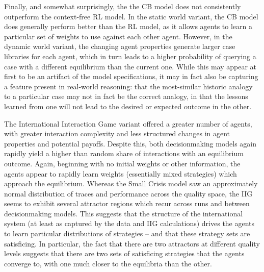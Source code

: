 Finally, and somewhat surprisingly, the the CB model does not consistently outperform the context-free RL model. In the static world variant, the CB model does generally perform better than the RL model, as it allows agents to learn a particular set of weights to use against each other agent. However, in the dynamic world variant, the changing agent properties generate larger case libraries for each agent, which in turn leads to a higher probability of querying a case with a different equilibrium than the current one. While this may appear at first to be an artifact of the model specifications, it may in fact also be capturing a feature present in real-world reasoning: that the most-similar historic analogy to a particular case may not in fact be the correct analogy, in that the lessons learned from one will not lead to the desired or expected outcome in the other.

The International Interaction Game variant offered a greater number of agents, with greater interaction complexity and less structured changes in agent properties and potential payoffs. Despite this, both decisionmaking models again rapidly yield a higher than random share of interactions with an equilibrium outcome. Again, beginning with no initial weights or other information, the agents appear to rapidly learn weights (essentially mixed strategies) which approach the equilibrium. Whereas the Small Crisis model saw an approximately normal distribution of traces and performance across the quality space, the IIG seems to exhibit several attractor regions which recur across runs and between decisionmaking models. This suggests that the structure of the international system (at least as captured by the data and IIG calculations) drives the agents to learn particular distributions of strategies -- and that these strategy sets are satisficing. In particular, the fact that there are two attractors at different quality levels suggests that there are two sets of satisficing strategies that the agents converge to, with one much closer to the equilibria than the other.

